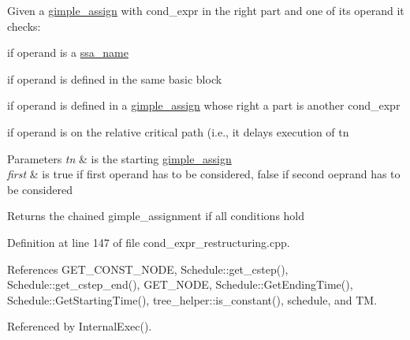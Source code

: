 Given a \hyperlink{structgimple__assign}{gimple\+\_\+assign} with cond\+\_\+expr in the right part and one of its operand it checks\+: 


\begin{DoxyItemize}
\item if operand is a \hyperlink{structssa__name}{ssa\+\_\+name}
\item if operand is defined in the same basic block
\item if operand is defined in a \hyperlink{structgimple__assign}{gimple\+\_\+assign} whose right a part is another cond\+\_\+expr
\item if operand is on the relative critical path (i.\+e., it delays execution of tn 
\begin{DoxyParams}{Parameters}
{\em tn} & is the starting \hyperlink{structgimple__assign}{gimple\+\_\+assign} \\
\hline
{\em first} & is true if first operand has to be considered, false if second oeprand has to be considered \\
\hline
\end{DoxyParams}
\begin{DoxyReturn}{Returns}
the chained gimple\+\_\+assignment if all conditions hold 
\end{DoxyReturn}

\end{DoxyItemize}

Definition at line 147 of file cond\+\_\+expr\+\_\+restructuring.\+cpp.



References G\+E\+T\+\_\+\+C\+O\+N\+S\+T\+\_\+\+N\+O\+DE, Schedule\+::get\+\_\+cstep(), Schedule\+::get\+\_\+cstep\+\_\+end(), G\+E\+T\+\_\+\+N\+O\+DE, Schedule\+::\+Get\+Ending\+Time(), Schedule\+::\+Get\+Starting\+Time(), tree\+\_\+helper\+::is\+\_\+constant(), schedule, and TM.



Referenced by Internal\+Exec().

